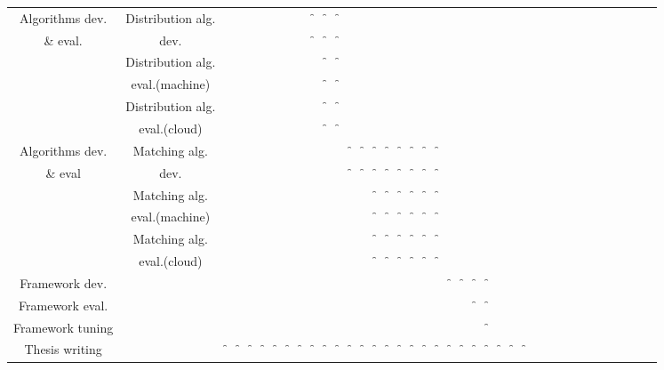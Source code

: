 \begin{table}
\begin{tabular}{|c|c|c|c|c|c|c|c|c|*{28}{c|}}
   Algorithms dev.								&	Distribution alg.		&		 
      &  &  &  &  &  &  &\f&\f&\f&  &  &  &  &  &  &  &  &  &  &  &  &  &  &  &  &  &\\ [0.01ex] 
   \& eval.										&	dev.		 		&		 
      &  &  &  &  &  &  &\f&\f&\f&  &  &  &  &  &  &  &  &  &  &  &  &  &  &  &  &  &\\ [0.01ex] \hline 
   												&	Distribution alg.		&		 
      &  &  &  &  &  &  &  &\f&\f&  &  &  &  &  &  &  &  &  &  &  &  &  &  &  &  &  &\\ [0.01ex] 
   											&	eval.(machine)		&		 
      &  &  &  &  &  &  &  &\f&\f&  &  &  &  &  &  &  &  &  &  &  &  &  &  &  &  &  &\\ [0.01ex] \hline 
   												&	Distribution alg.		&		 
      &  &  &  &  &  &  &  &\f&\f&  &  &  &  &  &  &  &  &  &  &  &  &  &  &  &  &  &\\ [0.01ex] 
   											&	eval.(cloud)		&		 
      &  &  &  &  &  &  &  &\f&\f&  &  &  &  &  &  &  &  &  &  &  &  &  &  &  &  &  &\\ [0.01ex] \hline
   Algorithms dev.								&	Matching alg.		&		 
      &  &  &  &  &  &  &  &  &  &\f&\f&\f&\f&\f&\f&\f&\f&  &  &  &  &  &  &  &  &  &\\ [0.01ex] 
   \& eval										&	dev.		 		&		 
      &  &  &  &  &  &  &  &  &  &\f&\f&\f&\f&\f&\f&\f&\f&  &  &  &  &  &  &  &  &  &\\ [0.01ex] \hline 
   												&	Matching alg.		&		 
      &  &  &  &  &  &  &  &  &  &  &  &\f&\f&\f&\f&\f&\f&  &  &  &  &  &  &  &  &  &\\ [0.01ex] 
   											&	eval.(machine)		&		 
      &  &  &  &  &  &  &  &  &  &  &  &\f&\f&\f&\f&\f&\f&  &  &  &  &  &  &  &  &  &\\ [0.01ex] \hline 
   												&	Matching alg.		&		 
      &  &  &  &  &  &  &  &  &  &  &  &\f&\f&\f&\f&\f&\f&  &  &  &  &  &  &  &  &  &\\ [0.01ex] 
   											&	eval.(cloud)		&		 
      &  &  &  &  &  &  &  &  &  &  &  &\f&\f&\f&\f&\f&\f&  &  &  &  &  &  &  &  &  &\\ [0.01ex] \hline 
  Framework dev.  									&			&		 
      &  &  &  &  &  &  &  &  &  &  &  &  &  &  &  &  &  &\f&\f&\f&\f&  &  &  &  &  &\\ [0.01ex] \hline  
  Framework eval.  									&			&		 
      &  &  &  &  &  &  &  &  &  &  &  &  &  &  &  &  &  &  &  &\f&\f&  &  &  &  &  &\\ [0.01ex] \hline 
  Framework tuning  									&			&		 
      &  &  &  &  &  &  &  &  &  &  &  &  &  &  &  &  &  &  &  &  &\f&  &  &  &  &  &\\ [0.01ex] \hline 
  Thesis writing  									&			&		 
    \f&\f&\f&\f&\f&\f&\f&\f&\f&\f&\f&\f&\f&\f&\f&\f&\f&\f&\f&\f&\f&\f&\f&\f&\f&  &  &\\ [0.01ex] \hline 
       
      

\end{tabular}
\label{tbl:timePlan}
\end{table}

  